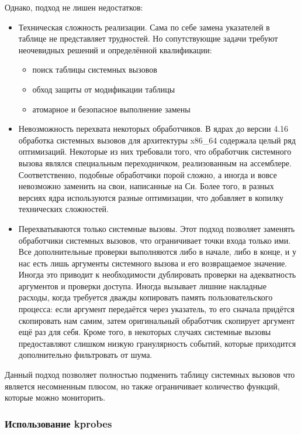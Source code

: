 \documentclass[a4paper,14pt]{extarticle}
\begin{document}
 	Однако, подход не лишен недостатков:
 	\begin{itemize}
 		\item Техническая сложность реализации. Сама по себе замена указателей в таблице не представляет трудностей. Но сопутствующие задачи требуют неочевидных решений и определённой квалификации:
 		\begin{itemize}
 			\item поиск таблицы системных вызовов
 			\item обход защиты от модификации таблицы
 			\item атомарное и безопасное выполнение замены
 		\end{itemize}
 		\item Невозможность перехвата некоторых обработчиков. В ядрах до версии 4.16 обработка системных вызовов для архитектуры x86\_64 содержала целый ряд оптимизаций. Некоторые из них требовали того, что обработчик системного вызова являлся специальным переходничком, реализованным на ассемблере. Соответственно, подобные обработчики порой сложно, а иногда и вовсе невозможно заменить на свои, написанные на Си. Более того, в разных версиях ядра используются разные оптимизации, что добавляет в копилку технических сложностей.
 		\item Перехватываются только системные вызовы. Этот подход позволяет заменять обработчики системных вызовов, что ограничивает точки входа только ими. Все дополнительные проверки выполняются либо в начале, либо в конце, и у нас есть лишь аргументы системного вызова и его возвращаемое значение. Иногда это приводит к необходимости дублировать проверки на адекватность аргументов и проверки доступа. Иногда вызывает лишние накладные расходы, когда требуется дважды копировать память пользовательского процесса: если аргумент передаётся через указатель, то его сначала придётся скопировать нам самим, затем оригинальный обработчик скопирует аргумент ещё раз для себя. Кроме того, в некоторых случаях системные вызовы предоставляют слишком низкую гранулярность событий, которые приходится дополнительно фильтровать от шума.
 	\end{itemize}
 	
 	Данный подход позволяет полностью подменить таблицу системных вызовов что является несомненным плюсом, но также ограничивает количество функций, которые можно мониторить.
 	
 	\subsubsection{Использование kprobes}
 	
\end{document}
